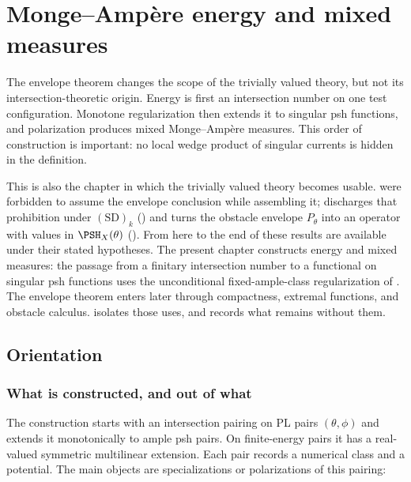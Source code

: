 \chapter{Monge--Amp\`ere energy and mixed measures}
\label{chap:bj-energy}

The envelope theorem changes the scope of the trivially valued theory, but
not its intersection-theoretic origin.  Energy is first an intersection
number on one test configuration.  Monotone regularization then extends it
to singular psh functions, and polarization produces mixed
Monge--Amp\`ere measures.  This order of construction is important: no
local wedge product of singular currents is hidden in the definition.

This is also the chapter in which the trivially valued theory becomes
usable.  
were forbidden to assume the envelope conclusion while assembling it;
 discharges that prohibition under
$\mathrm{(SD)}_k$ () and turns the obstacle envelope
$P_\theta$ into an operator with values in $\PSH_X(\theta)$
().  From here to the end of
 these results are available under their stated hypotheses.
The present chapter constructs energy and mixed measures: the passage from
a finitary intersection number to a functional on singular psh functions
uses the unconditional fixed-ample-class regularization of
.  The envelope theorem enters later
through compactness, extremal functions, and obstacle calculus.
 isolates those uses, and
 records what remains without them.

\section{Orientation}
\label{sec:ch46-orientation}

\subsection{What is constructed, and out of what}
\label{sec:ch46-what}

The construction starts with an intersection pairing on PL pairs
$(\theta,\phi)$ and extends it monotonically to ample psh pairs.
On finite-energy pairs it has a real-valued symmetric multilinear
extension.  Each pair records a numerical class and a potential.  The main objects are specializations
or polarizations of this pairing:

